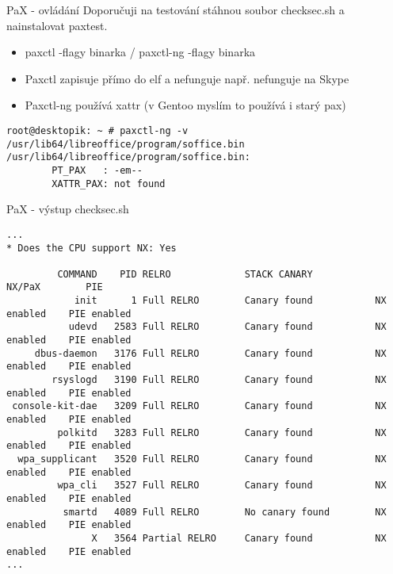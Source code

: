 \documentclass{beamer}
\begin{document}
\begin{frame}[fragile]{PaX - ovládání}
	Doporučuji na testování stáhnou soubor checksec.sh a nainstalovat paxtest.
	\begin{itemize}
		\item paxctl -flagy binarka / paxctl-ng -flagy binarka
		\item Paxctl zapisuje přímo do elf a nefunguje např. nefunguje na Skype
		\item Paxctl-ng používá xattr (v Gentoo myslím to používá i starý pax)
	\end{itemize}
	\begin{small}
	\begin{verbatim}
root@desktopik: ~ # paxctl-ng -v /usr/lib64/libreoffice/program/soffice.bin
/usr/lib64/libreoffice/program/soffice.bin:
        PT_PAX   : -em--
        XATTR_PAX: not found
	\end{verbatim}
	\end{small}
\end{frame}

\begin{frame}[fragile]{PaX - výstup checksec.sh}
	\begin{tiny}
	\begin{verbatim}
...
* Does the CPU support NX: Yes

         COMMAND    PID RELRO             STACK CANARY           NX/PaX        PIE
            init      1 Full RELRO        Canary found           NX enabled    PIE enabled
           udevd   2583 Full RELRO        Canary found           NX enabled    PIE enabled
     dbus-daemon   3176 Full RELRO        Canary found           NX enabled    PIE enabled
        rsyslogd   3190 Full RELRO        Canary found           NX enabled    PIE enabled
 console-kit-dae   3209 Full RELRO        Canary found           NX enabled    PIE enabled
         polkitd   3283 Full RELRO        Canary found           NX enabled    PIE enabled
  wpa_supplicant   3520 Full RELRO        Canary found           NX enabled    PIE enabled
         wpa_cli   3527 Full RELRO        Canary found           NX enabled    PIE enabled
          smartd   4089 Full RELRO        No canary found        NX enabled    PIE enabled
               X   3564 Partial RELRO     Canary found           NX enabled    PIE enabled
...
	\end{verbatim}
	\end{tiny}
\end{frame}
\end{document}
